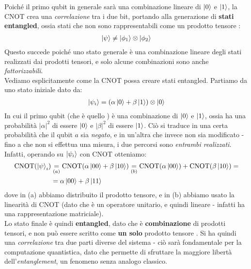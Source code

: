 \documentclass[../../InformazioneQuantistica.tex]{subfiles}
\begin{document}


Poiché il primo qubit in generale sarà una combinazione lineare di $\Ket{0}$ e $\Ket{1}$, la CNOT crea una \textit{correlazione} tra i due bit, portando alla generazione di \textbf{stati entangled}, ossia stati che non sono rappresentabili come un prodotto tensore :
\begin{align*}
\Ket{\psi} \neq \Ket{\phi_1} \otimes \Ket{\phi_2}
\end{align*}
Questo succede poiché uno stato generale è una combinazione lineare degli stati realizzati dai prodotti tensori, e solo alcune combinazioni sono anche \textit{fattorizzabili}.\\


Vediamo esplicitamente come la CNOT possa creare stati entangled. Partiamo da uno stato iniziale dato da:
\begin{align*}
\Ket{\psi_i} = \left(\alpha\Ket{0} + \beta\Ket{1}\right) \otimes \Ket{0}
\end{align*}
In cui il primo qubit (che è quello ) è una combinazione di $\Ket{0}$ e $\Ket{1}$, ossia ha una probabilità $|\alpha|^2$ di essere $\Ket{0}$ e $|\beta|^2$ di essere $\Ket{1}$. Ciò si traduce in una certa probabilità che il qubit $a$ sia \textit{negato}, e in un'altra che invece non sia modificato - fino a che non si effettua una misura, i due percorsi sono \textit{entrambi realizzati}. Infatti, operando su $\Ket{\psi_i}$ con CNOT otteniamo:
\begin{align*}
\operatorname{CNOT}(\Ket{\psi}_i) &\underset{(a)}{=} \operatorname{CNOT}(\alpha \Ket{00} + \beta \Ket{10}) \underset{(b)}{=} \operatorname{CNOT}(\alpha \Ket{00}) + \operatorname{CNOT}(\beta \Ket{10}) =\\
&= \alpha \Ket{00} + \beta \Ket{11}
\end{align*}
dove in (a) abbiamo distribuito il prodotto tensore, e in (b) abbiamo usato la linearità di CNOT (dato che è un operatore unitario, e quindi lineare - infatti  ha una rappresentazione matriciale).\\
Lo stato finale è quindi \textbf{entangled}, dato che è \textbf{combinazione} di prodotti tensori, e non può essere scritto come \textbf{un solo} prodotto tensore . Si ha quindi una \textit{correlazione} tra due parti diverse del sistema - ciò sarà fondamentale per la computazione quantistica, dato che permette di sfruttare la maggiore libertà dell'\textit{entanglement}, un fenomeno senza analogo classico.\\
\end{document}
